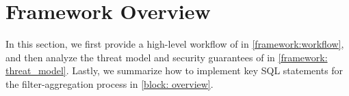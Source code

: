 \section{Framework Overview} \label{framework}
In this section, 
we first provide a high-level workflow 
of \NAME in \cref{framework:workflow},
and then analyze the threat model and security guarantees of \NAME
in \cref{framework: threat_model}. Lastly, we summarize how to
implement key SQL statements for the filter-aggregation process
in \cref{block: overview}.




%